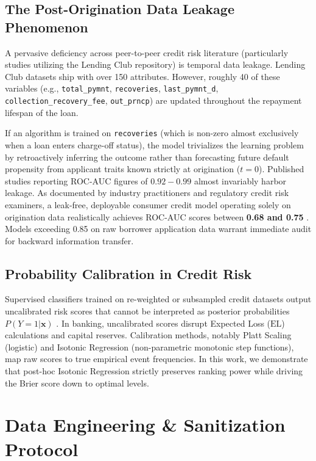 \documentclass[conference]{IEEEtran}
\begin{document}
\subsection{The Post-Origination Data Leakage Phenomenon}
A pervasive deficiency across peer-to-peer credit risk literature (particularly studies utilizing the Lending Club repository) is temporal data leakage. Lending Club datasets ship with over 150 attributes. However, roughly 40 of these variables (e.g., \texttt{total\_pymnt}, \texttt{recoveries}, \texttt{last\_pymnt\_d}, \texttt{collection\_recovery\_fee}, \texttt{out\_prncp}) are updated throughout the repayment lifespan of the loan. 

If an algorithm is trained on \texttt{recoveries} (which is non-zero almost exclusively when a loan enters charge-off status), the model trivializes the learning problem by retroactively inferring the outcome rather than forecasting future default propensity from applicant traits known strictly at origination ($t = 0$). Published studies reporting ROC-AUC figures of $0.92 - 0.99$ almost invariably harbor leakage. As documented by industry practitioners and regulatory credit risk examiners, a leak-free, deployable consumer credit model operating solely on origination data realistically achieves ROC-AUC scores between \textbf{0.68 and 0.75} \cite{altman1997, lessmann2015}. Models exceeding 0.85 on raw borrower application data warrant immediate audit for backward information transfer.

\subsection{Probability Calibration in Credit Risk}
Supervised classifiers trained on re-weighted or subsampled credit datasets output uncalibrated risk scores that cannot be interpreted as posterior probabilities $P(Y=1|\mathbf{x})$ \cite{niculescu2005}. In banking, uncalibrated scores disrupt Expected Loss ($\text{EL}$) calculations and capital reserves. Calibration methods, notably Platt Scaling (logistic) and Isotonic Regression (non-parametric monotonic step functions), map raw scores to true empirical event frequencies. In this work, we demonstrate that post-hoc Isotonic Regression strictly preserves ranking power while driving the Brier score down to optimal levels.

\section{Data Engineering \& Sanitization Protocol}
\end{document}
